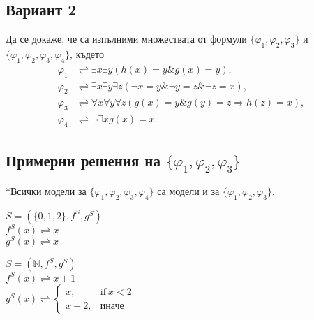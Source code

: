 \documentclass{article}
\renewcommand{\phi}{\varphi}
\theoremstyle{definition}
\newcommand{\Nat}{\mathbb{N}}
\renewcommand{\land}{\&}
\renewcommand{\phi}{\varphi}
\begin{document}
\subsection{Вариант 2}
  Да се докаже, че са изпълними множествата от формули
  $\{\phi_1,\phi_2,\phi_3\}$ и $\{\phi_1,\phi_2,\phi_3,\phi_4\}$, където
  \begin{align*}
  \phi_1 &\rightleftharpoons \exists x \exists y (h(x) = y \land
  g(x) = y),
  \\
  \phi_2 &\rightleftharpoons \exists x \exists y \exists z (\neg
  x = y \land \neg y = z \land \neg z = x),
  \\
  \phi_3 &\rightleftharpoons \forall x \forall y \forall z
  (g(x) = y \land g(y) = z \Longrightarrow h(z) = x),
  \\
  \phi_4 &\rightleftharpoons \neg\exists x g(x)=x.
  \end{align*}
\subsection{Примерни решения на $\{\phi_1,\phi_2,\phi_3\}$ }
*Всички модели за $\{\phi_1,\phi_2,\phi_3,\phi_4\}$ са модели и за $\{\phi_1,\phi_2,\phi_3\}$.\\
\begin{addmargin}[1em]{2em}
\begin{center}
$ S = ( \{0, 1, 2\}, f^S, g^S)$ \\
$f^S(x)\rightleftharpoons x$\\
$g^S(x)\rightleftharpoons x$
\end{center}
\end{addmargin}
\vskip 0.2in
\begin{addmargin}[1em]{2em}
\begin{center}
  $ S = (\Nat, f^S, g^S)$ \\
  $f^S(x)\rightleftharpoons x+1$\\
  $g^S(x)\rightleftharpoons 
  \begin{cases}
    x, & \text{if}\ x<2 \\
    x-2, & \text{иначе}
  \end{cases}$
\end{center}
\end{addmargin}
\end{document}
